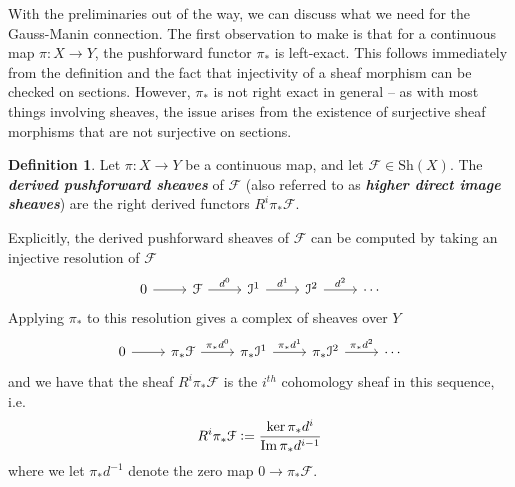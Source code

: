 \documentclass[psamsfonts, 12pt]{amsart}
\theoremstyle{definition}
\newtheorem{defn}[thm]{Definition}
\theoremstyle{remark}
\newcommand{\ib}[1]{\textbf{\textit{#1}}}
\newcommand{\defeq}{\vcentcolon=}
\DeclareMathOperator{\im}{Im}
\begin{document}
%
With the preliminaries out of the way, we can discuss what we need for the
Gauss-Manin connection. The first observation to make is that for a continuous
map $\pi : X \to Y$, the pushforward functor $\pi_*$ is left-exact. This follows
immediately from the definition and the fact that injectivity of a sheaf
morphism can be checked on sections. However, $\pi_*$ is not right exact in
general -- as with most things involving sheaves, the issue arises from the
existence of surjective sheaf morphisms that are not surjective on sections.
%
\begin{defn}
Let $\pi : X \to Y$ be a continuous map, and let $\mathcal{F} \in \mathrm{Sh}(X)$.
The \ib{derived pushforward sheaves} of $\mathcal{F}$ (also referred to as
\ib{higher direct image sheaves}) are the right derived  functors
$R^i\pi_*\mathcal{F}$.
\end{defn}
%
Explicitly, the derived pushforward sheaves of $\mathcal{F}$ can be computed
by taking an injective resolution of $\mathcal{F}$
\[\begin{tikzcd}
0 \ar[r] & \mathcal{F} \ar[r, "d^0"] &
\mathcal{I}^1 \ar[r, "d^1"] & \mathcal{I}^2 \ar[r, "d^2"] & \cdots
\end{tikzcd}\]
Applying $\pi_*$ to this resolution gives a complex of sheaves over $Y$
\[\begin{tikzcd}
0 \ar[r] & \pi_*\mathcal{F} \ar[r, "\pi_*d^0"] &
\pi_*\mathcal{I}^1 \ar[r, "\pi_*d^1"] & \pi_*\mathcal{I}^2 \ar[r, "\pi_*d^2"] & \cdots
\end{tikzcd}\]
and we have that the sheaf $R^i\pi_*\mathcal{F}$ is the $i^{th}$ cohomology
sheaf in this sequence, i.e.
\[
R^i\pi_*\mathcal{F} \defeq \frac{\ker \pi_*d^i}{\im \pi_*d^{i-1}}
\]
where we let $\pi_*d^{-1}$ denote the zero map $0 \to \pi_*\mathcal{F}$. \\
\end{document}
